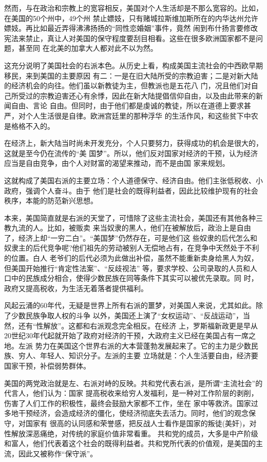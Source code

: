 ﻿\documentclass[11pt]{article}
\begin{document}
然而，与在政治和宗教上的宽容相反，美国对个人生活却是不那么宽容的。比如，在美国的50个州中，49个州
禁止嫖妓，只有赌城拉斯维加斯所在的内华达州允许嫖妓。再比如最近弄得沸沸扬扬的``同性恋婚姻''事件，竟然
闹到布什扬言要修改宪法来禁止，真让人对美国的保守程度要刮目相看。这些在很多欧洲国家都不是问题，甚至同
在北美的加拿大人都对此不以为然。

这充分说明了美国社会的右派本色。从历史上看，构成美国主流社会的中西欧早期移民，来到美国的主要原因
有二：一是在旧大陆所受的宗教迫害；二是对新大陆的经济机会的向往。他们虽以新教徒为主，但教派也是五花八
门，况且他们对自己所受过的宗教迫害还心有余悸，因此在新大陆提倡信仰自由，以及由此带来的新闻自由、言论
自由。但同时，由于他们都是虔诚的教徒，所以在道德上要求甚严，对个人生活很是自律。欧洲宫廷里的那种浮华
的生活作风，和这些贫下中农是格格不入的。

在经济上，新大陆当时尚未开发充分，个人只要努力，获得成功的机会是很大的，这就是至今仍在流传的``美
国梦''。所以，他们反对国家对经济的干预，认为经济应当是自由竞争，由个人对财富的渴望来推动，而不是由国
家来规划。

这就构成了美国右派的主要立场：个人道德保守、经济自由。他们主张低税收、小政府，强调个人奋斗。由于
他们是社会的既得利益者，因此比较维护现有的社会秩序，本能的防范新兴思想。

本来，美国简直就是右派的天堂了，可惜除了这些主流社会，美国还有其他各种三教九流的人。比如，被贩卖
来当奴隶的黑人，他们在被解放后，政治上是自由了，经济上却``一穷二白''。``美国梦''仍然存在，可是他们这
些奴隶的后代怎么和奴隶主的后代竞争呢?他们祖先的劳动被别人无偿地占有，在竞争中天然处于不利的位置。白人
老爷们的后代必须为此做出补偿，虽然不能重新卖身给黑人为奴，但美国开始推行``肯定性法案''、``反歧视法''
等，要求学校、公司录取的人员和人口中的民族成分相合，使得少数民族在同等条件下其实可以被优先录取。同
时，政府又提高税收，为生活无着落者提供福利。

风起云涌的60年代，无疑是世界上所有右派的噩梦，对美国人来说，尤其如此。除了少数民族争取人权的斗争
以外，美国还上演了``女权运动''、``反战运动''，当然，还有``性解放''。这都和右派观念完全相反。在经济
上，罗斯福新政更是早从20世纪30年代起就开始了政府对经济的干预，大政府主义已经在美国占有一席之地。左派
势力在美国这个世界右派的大本营蓬勃发展起来了。它的主力是少数民族、穷人、年轻人、知识分子。左派的主要
立场就是：个人生活要自由，经济要国家干预，补偿弱势群体。

美国的两党政治就是左、右派对峙的反映。共和党代表右派，是所谓``主流社会''的代言人，他们认为：国家
提高税收来给穷人发福利，是一种对工作阶层的剥削，伤害了人们工作的积极性，最终会鼓励大家都不工作，坐在
家中等救济。国家过多地干预经济，会造成经济的僵化，使经济彻底失去活力。同时，他们的观念保守，对国家有
很高的认同感和荣誉感，把反战人士看作是国家的叛徒(美奸)，对性解放深恶痛绝，对传统的家庭价值非常看重。
共和党的成员，大多是中产阶级和富人，他们代表着这个社会的既得利益者。共和党所代表的价值观，是美国的主
流，因此又被称作``保守派''。
\end{document}
